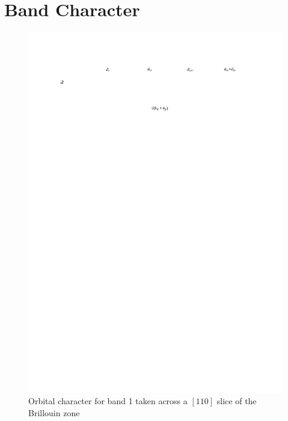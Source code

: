 
\chapter{\BaFeP{} Band Character}
\label{Appendix:BandCharacter110Slices}

\begin{figure}[h!]
    \begin{center}
        \includegraphics[scale=0.7]{Chapter-dHvABaFe2P2/Figures/AngleDepMeasurements/BandCharacterPlot/Band1_110Slice_BandCharacter}
        \caption{Orbital character for band 1 taken across a $[110]$ slice of the Brillouin zone}
        \label{Fig:Appendix:BandCharacter110Band1}
    \end{center}
\end{figure}

